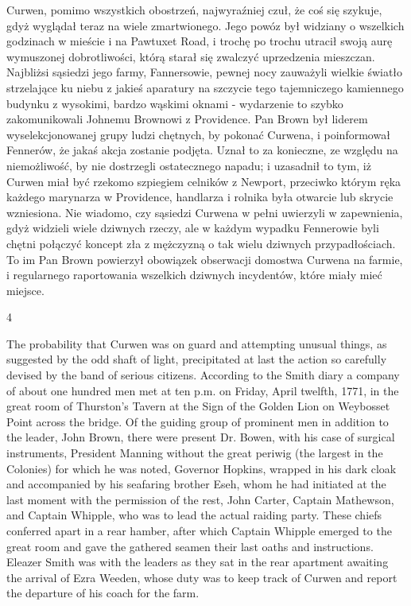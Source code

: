 Curwen, pomimo wszystkich obostrzeń, najwyraźniej czuł, że coś się szykuje, gdyż wyglądał teraz na wiele zmartwionego. Jego powóz był widziany o wszelkich godzinach w mieście i na Pawtuxet Road, i trochę po trochu utracił swoją aurę wymuszonej dobrotliwości, którą starał się zwalczyć uprzedzenia mieszczan. Najbliżsi sąsiedzi jego farmy, Fannersowie, pewnej nocy zauważyli wielkie światło strzelające ku niebu z jakieś aparatury na szczycie tego tajemniczego kamiennego budynku z wysokimi, bardzo wąskimi oknami - wydarzenie to szybko zakomunikowali Johnemu Brownowi z Providence. Pan Brown był liderem wyselekcjonowanej grupy ludzi chętnych, by pokonać Curwena, i poinformował Fennerów, że jakaś akcja zostanie podjęta. Uznał to za konieczne, ze względu na niemożliwość, by nie dostrzegli ostatecznego napadu; i uzasadnił to tym, iż Curwen miał być rzekomo szpiegiem celników z Newport, przeciwko którym ręka każdego marynarza w Providence, handlarza i rolnika była otwarcie lub skrycie wzniesiona. Nie wiadomo, czy sąsiedzi Curwena w pełni uwierzyli w zapewnienia, gdyż widzieli wiele dziwnych rzeczy, ale w każdym wypadku Fennerowie byli chętni połączyć koncept zła z mężczyzną o tak wielu dziwnych przypadłościach. To im Pan Brown powierzył obowiązek obserwacji domostwa Curwena na farmie, i regularnego raportowania wszelkich dziwnych incydentów, które miały mieć miejsce. 

\begin{center}

4

\end{center}

The probability that Curwen was on guard and attempting unusual things, as suggested by the odd shaft of light, precipitated at last the action so carefully devised by the band of serious citizens. According to the Smith diary a company of about one hundred men met at ten p.m. on Friday, April twelfth, 1771, in the great room of Thurston's Tavern at the Sign of the Golden Lion on Weybosset Point across the bridge. Of the guiding group of prominent men in addition to the leader, John Brown, there were present Dr. Bowen, with his case of surgical instruments, President Manning without the great periwig (the largest in the Colonies) for which he was noted, Governor Hopkins, wrapped in his dark cloak and accompanied by his seafaring brother Eseh, whom he had initiated at the last moment with the permission of the rest, John Carter, Captain Mathewson, and Captain Whipple, who was to lead the actual raiding party. These chiefs conferred apart in a rear hamber, after which Captain Whipple emerged to the great room and gave the gathered seamen their last oaths and instructions. Eleazer Smith was with the leaders as they sat in the rear apartment awaiting the arrival of Ezra Weeden, whose duty was to keep track of Curwen and report the departure of his coach for the farm.


